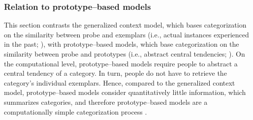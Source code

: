 \documentclass[a4paper,man,natbib]{apa6}
\begin{document}
\subsubsection{Relation to prototype--based models}
This section contrasts the generalized context model, which bases categorization on the similarity between probe and exemplars (i.e., actual instances experienced in the past; \citealp{medin1978context, nosofsky1986attention}), with prototype--based models, which base categorization on the similarity between probe and prototypes (i.e., abstract central tendencies; \citealp{posner1968genesis}). 
On the computational level, prototype--based models require people to abstract a central tendency of a category. In turn, people do not have to retrieve the category's individual exemplars. Hence, compared to the generalized context model, prototype--based models consider quantitatively little information, which summarizes categories, and therefore prototype--based models are a computationally simple categorization process \citep{smith1998prototypes}. 
\end{document}
